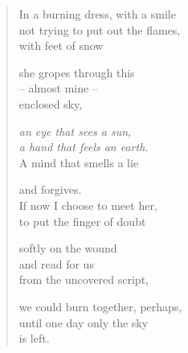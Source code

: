 {\begin{verse}
In a burning dress, with a smile\\
not trying to put out the flames,\\
with feet of snow

she gropes through this\\
-- almost mine --\\
enclosed sky,

\emph{an eye that sees a sun,\\
a hand that feels an earth.}\label{schop-die-welt}\\
A mind that smells a lie

and forgives.\\
If now I choose to meet her,\\
to put the finger of doubt

softly on the wound\\
and read for us\\
from the uncovered script,

we could burn together, perhaps,\\
until one day only the sky\\
is left.

\end{verse}

}
